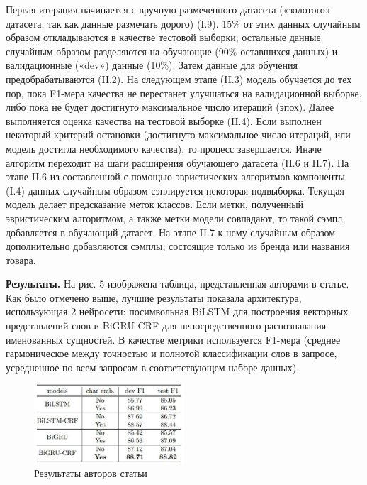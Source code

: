 \documentclass[12pt,a4paper]{article}
\begin{document}
\noindent Первая итерация начинается с вручную размеченного датасета («золотого» датасета, так как данные размечать дорого) (I.9). 15\% от этих данных случайным образом откладываются в качестве тестовой выборки; остальные данные случайным образом разделяются на обучающие (90\% оставшихся данных) и валидационные («dev») данные (10\%). Затем данные для обучения предобрабатываются (II.2). На следующем этапе (II.3) модель обучается до тех пор, пока F1-мера качества не перестанет улучшаться на валидационной выборке, либо пока не будет достигнуто максимальное число итераций (эпох). Далее выполняется оценка качества на тестовой выборке (II.4). Если выполнен некоторый критерий остановки (достигнуто максимальное число итераций, или модель достигла необходимого качества), то процесс завершается. Иначе алгоритм переходит на шаги расширения обучающего датасета (II.6 и II.7). На этапе II.6 из составленной с помощью эвристических алгоритмов компоненты (I.4) данных случайным образом сэплируется некоторая подвыборка. Текущая модель делает предсказание меток классов. Если метки, полученный эвристическим алгоритмом, а также метки модели совпадают, то такой сэмпл добавляется в обучающий датасет. На этапе II.7 к нему случайным образом дополнительно добавляются сэмплы, состоящие только из бренда или названия товара. 

\textbf{Результаты.} На рис. 5 изображена таблица, представленная авторами в статье. Как было отмечено выше, лучшие результаты показала архитектура, использующая 2 нейросети: посимвольная BiLSTM для построения векторных представлений слов и BiGRU-CRF для непосредственного распознавания именованных сущностей. В качестве метрики используется F1-мера (среднее гармоническое между точностью и полнотой классификации слов в запросе, усредненное по всем запросам в соответствующем наборе данных).

\begin{figure}[H]
\begin{center}
  \includegraphics[width=0.5\textwidth]{tab.jpg}
  \caption{Результаты авторов статьи}
\end{center}
\end{figure}
\end{document}
